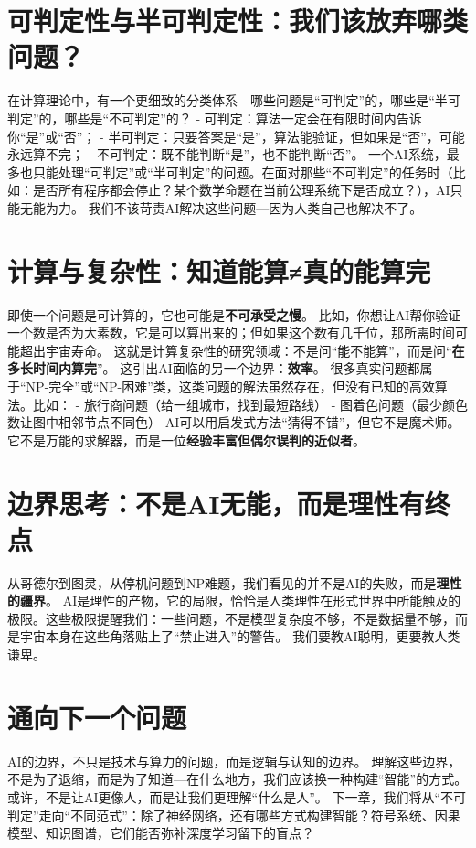 \section*{可判定性与半可判定性：我们该放弃哪类问题？}
在计算理论中，有一个更细致的分类体系---哪些问题是“可判定”的，哪些是“半可判定”的，哪些是“不可判定”的？
- 可判定：算法一定会在有限时间内告诉你“是”或“否”；
- 半可判定：只要答案是“是”，算法能验证，但如果是“否”，可能永远算不完；
- 不可判定：既不能判断“是”，也不能判断“否”。
一个AI系统，最多也只能处理“可判定”或“半可判定”的问题。在面对那些“不可判定”的任务时（比如：是否所有程序都会停止？某个数学命题在当前公理系统下是否成立？），AI只能无能为力。
我们不该苛责AI解决这些问题---因为人类自己也解决不了。
\section*{计算与复杂性：知道能算≠真的能算完}
即使一个问题是可计算的，它也可能是\textbf{不可承受之慢}。
比如，你想让AI帮你验证一个数是否为大素数，它是可以算出来的；但如果这个数有几千位，那所需时间可能超出宇宙寿命。
这就是计算复杂性的研究领域：不是问“能不能算”，而是问“\textbf{在多长时间内算完}”。
这引出AI面临的另一个边界：\textbf{效率}。
很多真实问题都属于“NP-完全”或“NP-困难”类，这类问题的解法虽然存在，但没有已知的高效算法。比如：
- 旅行商问题（给一组城市，找到最短路线）
- 图着色问题（最少颜色数让图中相邻节点不同色）
AI可以用启发式方法“猜得不错”，但它不是魔术师。它不是万能的求解器，而是一位\textbf{经验丰富但偶尔误判的近似者}。
\section*{边界思考：不是AI无能，而是理性有终点}
从哥德尔到图灵，从停机问题到NP难题，我们看见的并不是AI的失败，而是\textbf{理性的疆界}。
AI是理性的产物，它的局限，恰恰是人类理性在形式世界中所能触及的极限。这些极限提醒我们：一些问题，不是模型复杂度不够，不是数据量不够，而是宇宙本身在这些角落贴上了“禁止进入”的警告。
我们要教AI聪明，更要教人类谦卑。
\section*{通向下一个问题}
AI的边界，不只是技术与算力的问题，而是逻辑与认知的边界。
理解这些边界，不是为了退缩，而是为了知道---在什么地方，我们应该换一种构建“智能”的方式。或许，不是让AI更像人，而是让我们更理解“什么是人”。
下一章，我们将从“不可判定”走向“不同范式”：除了神经网络，还有哪些方式构建智能？符号系统、因果模型、知识图谱，它们能否弥补深度学习留下的盲点？
\nocite{*}
\printbibliography[heading=bibintoc, title=\ebibname]
\newpage
